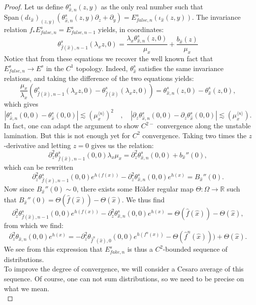 \documentclass[a4paper]{article}
\theoremstyle{definition}
\begin{document}
\begin{proof}
Let us define $\theta_{{\widehat{x}},n}^s(z,y)$ as the only real number such that $ \text{Span} (d \iota_{\widehat{x}})_{(z,y)}( \theta_{{\widehat{x}},n}^s(z,y) \partial_z + \partial_y ) = E^s_{false,n}(\iota_{\widehat{x}}(z,y)).$
The invariance relation $f_* E_{false,n}^s = E_{false,n-1}^s$
yields, in coordinates:
$$ \theta_{\widehat{f}({\widehat{x}}),n-1}^s(\lambda_x z,0) = \frac{\lambda_x \theta_{{\widehat{x}},n}^s(z,0) }{\mu_x} + \frac{b_{\widehat{x}}(z)}{\mu_x} $$
Notice that from these equations we recover the well known fact that $E^s_{false,n} \rightarrow E^s$ in the $C^1$ topology. Indeed, $\theta_{\widehat{x}}^s$ satisfies the same invariance relations, and taking the difference of the two equations yields:
$$ \frac{\mu_x}{\lambda_x}( \theta_{\widehat{f}({\widehat{x}}),n-1}^s(\lambda_x z,0) - \theta_{\widehat{f}({\widehat{x}})}^s(\lambda_x z,0)) =  \theta_{{\widehat{x}},n}^s(z,0) - \theta_{{\widehat{x}}}^s(z,0) ,$$
which gives
$$ |\theta_{{\widehat{x}},n}^s(0,0) - \theta_{{\widehat{x}}}^s(0,0)| \lesssim (\mu_x^{\langle n \rangle})^2 \quad, \quad |\partial_z \theta_{{\widehat{x}},n}^s(0,0) - \partial_z \theta_{{\widehat{x}}}^s(0,0)| \lesssim (\mu_x^{\langle n \rangle}). $$
In fact, one can adapt the argument to show $C^{2-}$ convergence along the unstable lamination. But this is not enough yet for $C^2$ convergence. Taking two times the $z$-derivative and letting $z=0$ gives us the relation:
$$ \partial_z^2\theta_{\widehat{f}({\widehat{x}}),n-1}^s( 0,0) \lambda_x \mu_x =  \partial_z^2 \theta_{{\widehat{x}},n}^s(0,0)  + b_{\widehat{x}}''(0) ,$$
which can be rewritten
$$ \partial_z^2\theta_{\widehat{f}({\widehat{x}}),n-1}^s( 0,0) e^{h(f(x))} - \partial_z^2\theta_{{\widehat{x}},n}^s(0,0) e^{h(x)} = B_{\widehat{x}}''(0). $$
Now since $B_{\widehat{x}}''(0) \sim 0$, there exists some Hölder regular map $\Theta:\Omega\rightarrow \mathbb{R}$ such that $B_{\widehat{x}}''(0) = \Theta(\widehat{f}({\widehat{x}})) - \Theta(\widehat{x})$. We thus find
$$ \partial_z^2\theta_{\widehat{f}({\widehat{x}}),n-1}^s( 0,0) e^{h(f(x))} - \partial_z^2\theta_{{\widehat{x}},n}^s(0,0) e^{h(x)} = \Theta(\widehat{f}({\widehat{x}})) - \Theta({\widehat{x}}), $$
from which we find:
$$  \partial_z^2 \theta_{{\widehat{x}},n}(0,0) e^{h(x)} = - \partial_z^2 \theta_{\widehat{f}^n({\widehat{x}}),0}(0,0) e^{h(f^n(x))} - \Theta(\widehat{f}^n(\widehat{x}))) + \Theta(\widehat{x}). $$
We see from this expression that $E^s_{fake,n}$ is thus a $C^2$-bounded sequence of distributions. \\

To improve the degree of convergence, we will consider a Cesaro average of this sequence. Of course, one can not sum distributions, so we need to be precise on what we mean. \\


\end{proof}
\end{document}
